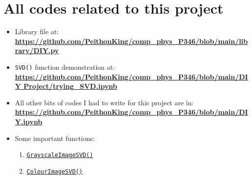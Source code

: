 \section{All codes related to this project}
	\begin{itemize}
		\item Library file at:\\
		\href{https://github.com/PeithonKing/comp_phys_P346/blob/main/library/DIY.py}{\textbf{https://github.com/PeithonKing/comp\_phys\_P346/blob/main/library/DIY.py}}

		\item \texttt{SVD()} function demonstration at:\\
		\href{https://github.com/PeithonKing/comp_phys_P346/blob/main/DIY%20Project/trying_SVD.ipynb}{\textbf{https://github.com/PeithonKing/comp\_phys\_P346/blob/main/DIY Project/trying\_SVD.ipynb}}

		\item All other bits of codes I had to write for this project are in:\\
		\href{https://github.com/PeithonKing/comp_phys_P346/blob/main/DIY.ipynb}{\textbf{https://github.com/PeithonKing/comp\_phys\_P346/blob/main/DIY.ipynb}}

		\item Some important functions: 
		
		\begin{enumerate}
			\item \href{https://github.com/PeithonKing/comp_phys_P346/blob/main/library/DIY.py#L50-L72}{\texttt{GrayscaleImageSVD()}}
			\item \href{https://github.com/PeithonKing/comp_phys_P346/blob/main/library/DIY.py#L74-L119}{\texttt{ColourImageSVD()}}
		\end{enumerate}
		
		
		
		
	\end{itemize}